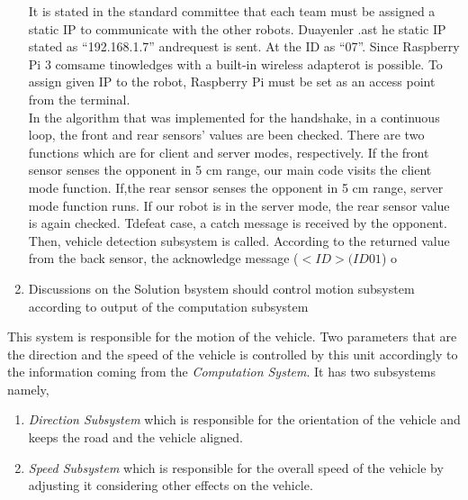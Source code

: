\documentclass[a4paper,12pt]{article}
\begin{document}
\begin{enumerate}
	It is stated in the standard committee that each team must be assigned a static IP to communicate with the other robots. Duayenler .ast he static IP stated as “192.168.1.7” andrequest is sent. At the ID as “07”. Since Raspberry Pi 3 comsame tinowledges with a built-in wireless adapterot is possible. To assign given IP to the robot, Raspberry Pi must be set as an access point from the terminal.\\
	
	In the algorithm that was implemented for the handshake, in a continuous loop, the front and rear sensors' values are been checked. There are two functions which are for client and server modes, respectively. If the front sensor senses the opponent in 5 cm range, our main code visits the client mode function. If,the rear sensor senses the opponent in 5 cm range, server mode function runs. If our robot is in the server mode, the rear sensor value is again checked. Tdefeat case, a catch message is received by the opponent. Then, vehicle detection subsystem is called. According to the returned value from the back sensor, the acknowledge message ($< ID> (ID01$) o

	\item {Discussions on the Solution}                                                	                                                                                                                                                                                                                              bsystem should control motion subsystem according to output of the computation subsystem
			
		\end{enumerate}
	
	
	
	This system is responsible for the motion of the vehicle. Two parameters that are the direction and the speed of the vehicle is controlled by this unit accordingly to the information coming from the \textit{Computation System}. It has two subsystems namely,
			
			\begin{enumerate}
				\item \textit{Direction Subsystem} which is responsible for the orientation of the vehicle and keeps the road and the vehicle aligned.
				\item \textit{Speed Subsystem} which is responsible for the overall speed of the vehicle by adjusting it considering other effects on the vehicle.
			\end{enumerate}
			
\end{document}
